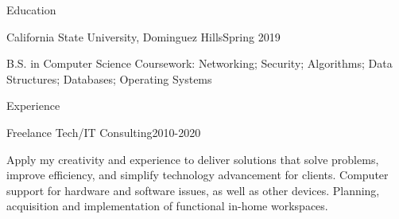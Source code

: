 \documentclass[]{mcdowellcv}
\begin{document}
	\makeheader
	
	\begin{cvsection}{Education}
		\begin{cvsubsection}{California State University, Dominguez Hills}{Spring 2019}
			
			\par B.S. in Computer Science
			\newline Coursework: Networking; Security; Algorithms; Data Structures; Databases; Operating Systems
			
		\end{cvsubsection}
	\end{cvsection}

	\begin{cvsection}{Experience}
		\begin{cvsubsection}{Freelance Tech/IT Consulting}{2010-2020}	
			\par Apply my creativity and experience to deliver solutions that solve problems, improve efficiency, and simplify technology advancement for clients. Computer support for hardware and software issues, as well as other devices. Planning, acquisition and implementation of functional in-home workspaces.
		\end{cvsubsection}
	\end{cvsection}
\end{document}
